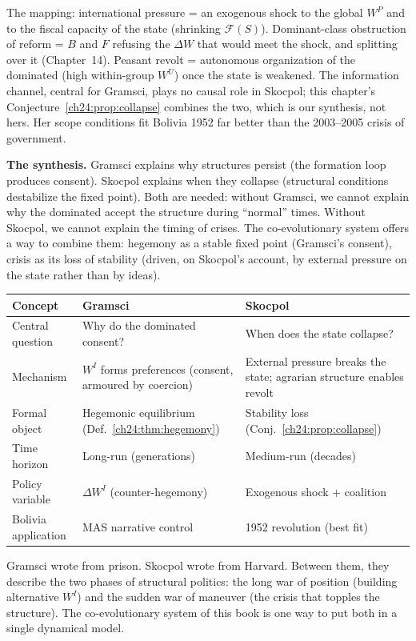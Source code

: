 \documentclass[../structural_economics_book.tex]{subfiles}
\begin{document}
The mapping: international pressure = an exogenous shock to the global $W^P$ and to the fiscal capacity of the state (shrinking $\mathcal{F}(S)$). Dominant-class obstruction of reform = $B$ and $F$ refusing the $\Delta W$ that would meet the shock, and splitting over it (Chapter~14). Peasant revolt = autonomous organization of the dominated (high within-group $W^U$) once the state is weakened. The information channel, central for Gramsci, plays no causal role in Skocpol; this chapter's Conjecture~\ref{ch24:prop:collapse} combines the two, which is our synthesis, not hers. Her scope conditions fit Bolivia 1952 far better than the 2003--2005 crisis of government.

\textbf{The synthesis.} Gramsci explains why structures persist (the formation loop produces consent). Skocpol explains when they collapse (structural conditions destabilize the fixed point). Both are needed: without Gramsci, we cannot explain why the dominated accept the structure during ``normal'' times. Without Skocpol, we cannot explain the timing of crises. The co-evolutionary system offers a way to combine them: hegemony as a stable fixed point (Gramsci's consent), crisis as its loss of stability (driven, on Skocpol's account, by external pressure on the state rather than by ideas).

\begin{center}
\begin{tabularx}{\textwidth}{LLL}
\toprule
\textbf{Concept} & \textbf{Gramsci} & \textbf{Skocpol} \\
\midrule
Central question & Why do the dominated consent? & When does the state collapse? \\
Mechanism & $W^I$ forms preferences (consent, armoured by coercion) & External pressure breaks the state; agrarian structure enables revolt \\
Formal object & Hegemonic equilibrium (Def.~\ref{ch24:thm:hegemony}) & Stability loss (Conj.~\ref{ch24:prop:collapse}) \\
Time horizon & Long-run (generations) & Medium-run (decades) \\
Policy variable & $\Delta W^I$ (counter-hegemony) & Exogenous shock + coalition \\
Bolivia application & MAS narrative control & 1952 revolution (best fit) \\
\bottomrule
\end{tabularx}
\end{center}

Gramsci wrote from prison. Skocpol wrote from Harvard. Between them, they describe the two phases of structural politics: the long war of position (building alternative $W^I$) and the sudden war of maneuver (the crisis that topples the structure). The co-evolutionary system of this book is one way to put both in a single dynamical model.
\end{document}
